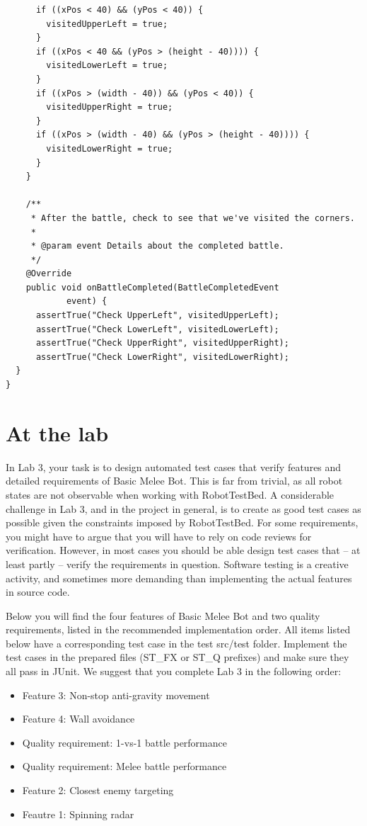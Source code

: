 \documentclass{scrreprt}
\begin{document}
\begin{verbatim}
      if ((xPos < 40) && (yPos < 40)) {
        visitedUpperLeft = true;
      }
      if ((xPos < 40 && (yPos > (height - 40)))) {
        visitedLowerLeft = true;
      }
      if ((xPos > (width - 40)) && (yPos < 40)) {
        visitedUpperRight = true;
      }
      if ((xPos > (width - 40) && (yPos > (height - 40)))) {
        visitedLowerRight = true;
      }
	}

	/**
	 * After the battle, check to see that we've visited the corners.
	 *
	 * @param event Details about the completed battle.
	 */
	@Override
	public void onBattleCompleted(BattleCompletedEvent
			event) {
      assertTrue("Check UpperLeft", visitedUpperLeft);
      assertTrue("Check LowerLeft", visitedLowerLeft);
      assertTrue("Check UpperRight", visitedUpperRight);
      assertTrue("Check LowerRight", visitedLowerRight);
  }
}
\end{verbatim}

\chapter{At the lab} \label{sec:atlab}
In Lab 3, your task is to design automated test cases that verify features and detailed requirements of Basic Melee Bot. This is far from trivial, as all robot states are not observable when working with RobotTestBed. A considerable challenge in Lab 3, and in the project in general, is to create as good test cases as possible given the constraints imposed by RobotTestBed. For some requirements, you might have  to argue that you will have to rely on code reviews for verification. However, in most cases you should be able design test cases that -- at least partly -- verify the requirements in question. Software testing is a creative activity, and sometimes more demanding than implementing the actual features in source code.

Below you will find the four features of Basic Melee Bot and two quality requirements, listed in the recommended implementation order. All items listed below have a corresponding test case in the test src/test folder. Implement the test cases in the prepared files (ST_FX or ST_Q prefixes) and make sure they all pass in JUnit. We suggest that you complete Lab 3 in the following order:

\begin{itemize}
\item Feature 3: Non-stop anti-gravity movement
\item Feature 4: Wall avoidance 
\item Quality requirement: 1-vs-1 battle performance
\item Quality requirement: Melee battle performance
\item Feature 2: Closest enemy targeting
\item Feautre 1: Spinning radar
\end{itemize}
\end{document}
